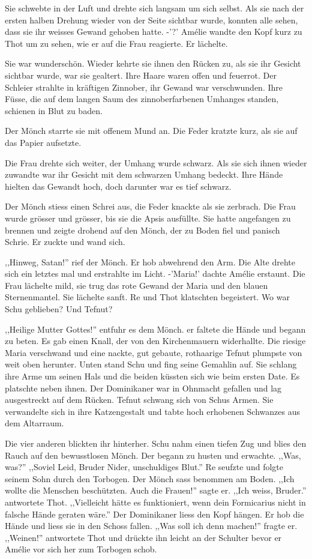 \documentclass[11pt,titlepage,a5paper]{book}
\begin{document}
Sie schwebte in der Luft und drehte sich langsam um sich selbst. Als sie nach der ersten halben Drehung wieder von der Seite sichtbar wurde, konnten alle sehen, dass sie ihr weisses Gewand gehoben hatte. -'?' Amélie wandte den Kopf kurz zu Thot um zu sehen, wie er auf die Frau reagierte. Er lächelte. 

Sie war wunderschön. Wieder kehrte sie ihnen den Rücken zu, als sie  ihr Gesicht sichtbar wurde, war sie gealtert. Ihre Haare waren offen und feuerrot. Der Schleier strahlte in kräftigen Zinnober, ihr Gewand war verschwunden. Ihre Füsse, die auf dem langen Saum des zinnoberfarbenen Umhanges standen, schienen in Blut zu baden.

Der Mönch starrte sie mit offenem Mund an. Die Feder kratzte kurz, als sie auf das Papier aufsetzte. 

Die Frau drehte sich weiter, der Umhang wurde schwarz. Als sie sich ihnen wieder zuwandte war ihr Gesicht mit dem schwarzen Umhang bedeckt. Ihre Hände hielten das Gewandt hoch, doch darunter war es tief schwarz.

Der Mönch stiess einen Schrei aus, die Feder knackte als sie zerbrach. Die Frau wurde grösser und grösser, bis sie die Apsis ausfüllte. Sie hatte angefangen zu brennen und zeigte drohend auf den Mönch, der zu Boden fiel und panisch Schrie. Er zuckte und wand sich. 

,,Hinweg, Satan!'' rief der Mönch. Er hob abwehrend den Arm. Die Alte drehte sich ein letztes mal und erstrahlte im Licht. -'Maria!' dachte Amélie erstaunt. Die Frau lächelte mild, sie trug das rote Gewand der Maria und den blauen Sternenmantel. Sie lächelte sanft. Re und Thot klatschten begeistert. Wo war Schu geblieben? Und Tefnut?

,,Heilige Mutter Gottes!'' entfuhr es dem Mönch. er faltete die Hände und begann zu beten. Es gab einen Knall, der von den Kirchenmauern widerhallte. Die riesige Maria verschwand und eine nackte, gut gebaute, rothaarige Tefnut plumpste von weit oben herunter.  Unten stand Schu und fing seine Gemahlin auf. Sie schlang ihre Arme um seinen Hals und die beiden küssten sich wie beim ersten Date. Es platschte neben ihnen. Der Dominikaner war in Ohnmacht gefallen und lag ausgestreckt auf dem Rücken. Tefnut schwang sich von Schus Armen. Sie verwandelte sich in ihre Katzengestalt und tabte hoch erhobenen Schwanzes aus dem Altarraum.

Die vier anderen blickten ihr hinterher. Schu nahm einen tiefen Zug und blies den Rauch auf den bewusstlosen Mönch. Der begann zu husten und erwachte. ,,Was, was?'' ,,Soviel Leid, Bruder Nider, unschuldiges Blut.'' Re seufzte und folgte seinem Sohn durch den Torbogen. Der Mönch sass benommen am Boden. ,,Ich wollte die Menschen beschützten. Auch die Frauen!'' sagte er. ,,Ich weiss, Bruder.'' antwortete Thot. ,,Vielleicht hätte es funktioniert, wenn dein Formicarius nicht in falsche Hände geraten wäre.''  Der Dominikaner liess den Kopf hängen. Er hob die Hände und liess sie in den Schoss fallen. ,,Was soll ich denn machen!'' fragte er. ,,Weinen!'' antwortete Thot und drückte ihn leicht an der Schulter bevor er Amélie vor sich her zum Torbogen schob.
\end{document}
